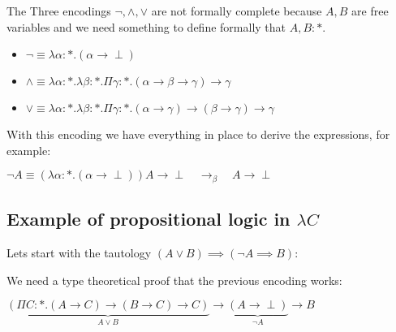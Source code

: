 \documentclass[12pt, a4paper]{article}
\newcommand{\onebeta}{\to_\beta}
\begin{document}
\begin{flagderiv}
\end{flagderiv}

The Three encodings $\neg, \land, \lor$ are not formally complete because $A, B$ are free variables and we need something to define formally that $A, B : *$.

\begin{itemize}
    \item $\neg \equiv \lambda \alpha : *. (\alpha \to \perp)$
    \item $\land \equiv \lambda \alpha : *. \lambda \beta : *. \Pi \gamma : * . (\alpha \to \beta \to \gamma) \to \gamma$
    \item $\lor \equiv \lambda \alpha : *. \lambda \beta : *. \Pi \gamma : * . (\alpha \to \gamma) \to (\beta \to \gamma) \to \gamma$
\end{itemize}

With this encoding we have everything in place to derive the expressions, for example:

$\neg A \equiv (\lambda \alpha : *. (\alpha \to \perp))A \to \perp \quad \onebeta \quad A \to \perp$

\subsection{Example of propositional logic in \texorpdfstring{$\lambda C$}{}}

Lets start with the tautology $(A \lor B) \implies (\neg A \implies B)$:

We need a type theoretical proof that the previous encoding works:

$\underbrace{(\Pi C : *. (A \to C) \to (B \to C) \to C)}_{A \lor B} \to \underbrace{(A \to \perp)}_{\neg A} \to B$
\end{document}
